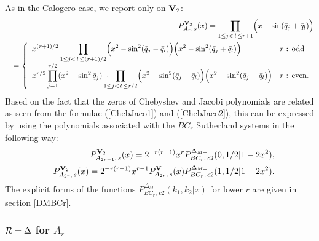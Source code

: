 \documentclass[a4paper,12pt]{article}
\begin{document}
As in the Calogero case, we report only on ${\bf V}_2$:
\begin{eqnarray}
   &&\;\;P_{A_r,\,s}^{{\bf V}_2}(x)=\prod_{1\leq j<\,l\,\leq r+1}
   \Bigl(x-\sin(\bar{q}_j+\bar{q}_l)\Bigr)\\
%
   &&=
   \left\{\begin{array}{ll}
   {\displaystyle x^{(r+1)/2}\prod_{1\leq j<\,l\,\leq(r+1)/2}
   \Bigl(x^2-\sin^2(\bar{q}_j-\bar{q}_l)\Bigr)
   \Bigl(x^2-\sin^2(\bar{q}_j+\bar{q}_l)\Bigr)}&\mbox{$r$ : odd}\\
   {\displaystyle x^{r/2}\prod_{j=1}^{r/2}(x^2-\sin^2\bar{q}_j)
   \;\cdot\!\!\!\!\! \prod_{1\leq j<\,l\,\leq r/2}
   \Bigl(x^2-\sin^2(\bar{q}_j-\bar{q}_l)\Bigr)
   \Bigl(x^2-\sin^2(\bar{q}_j+\bar{q}_l)\Bigr)}&\mbox{$r$ : even}.
   \end{array}\right.\nonumber
\end{eqnarray}
Based on the fact that the zeros of Chebyshev and Jacobi polynomials are
related as seen from the formulae (\ref{ChebJaco1}) and (\ref{ChebJaco2}),
this can be expressed by using the polynomials associated with the $BC_r$
Sutherland systems in the following way:
\begin{eqnarray}
   &&P_{A_{2r-1},\,s}^{{\bf V}_2}(x)
   =2^{-r(r-1)}x^rP_{BC_r,\,c2}^{\Delta_{M+}}(0,1/2|1-2x^2),\\
%
   &&P_{A_{2r},\,s}^{{\bf V}_2}(x)
   =2^{-r(r-1)}x^{r-1}P_{A_{2r},\,s}^{{\bf V}}(x)
   P_{BC_r,\,c2}^{\Delta_{M+}}(1,1/2|1-2x^2).
\end{eqnarray}
The explicit forms of the functions
$P_{BC_r,\,c2}^{\Delta_{M+}}(k_1,k_2|x)$ for lower $r$ are given
in section \ref{DMBCr}.

\subsubsection{${\cal R}=\Delta$ for $A_r$}
\end{document}
